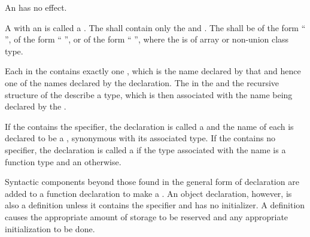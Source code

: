 \pnum
An  has no effect.

\pnum
A  with an  is called
a .
The  shall
contain only the  
and .
The  shall be
of the form ``\tcode{=} '',
of the form ``\tcode{\{}  \tcode{\}}'',
or
of the form ``\tcode{(}  \tcode{)}'',
where the
 is of array or non-union class type.

\pnum
Each  in the 
contains exactly one , which is the name
declared by that  and hence one of the names
declared by the declaration. The
 in the
 and the recursive 
structure of the  describe a
type, which is then associated with the name being
declared by the .

\pnum
If the  contains the 
specifier, the declaration is called a  and the name
of each 
is declared to be a , synonymous with its
associated type. If the
 contains no  specifier, the
declaration is called a  if
the type associated with the name is a function type and
an  otherwise.

\pnum
{}%
Syntactic components beyond those found in the general form of
declaration are added to a function declaration to make a
. An object declaration, however, is also
a definition unless it contains the  specifier and has no
initializer.
%
A
definition causes the appropriate amount of storage to be reserved and
any appropriate initialization to be done.

